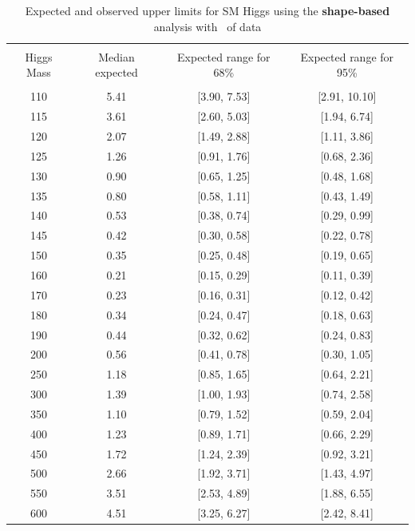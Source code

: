 \begin{table}[hbp!]
\begin{center}
\begin{tabular}{c c c c}
\hline
\vspace{-3mm} && \\
 Higgs Mass   & Median expected & Expected range for 68\% & Expected range for 95\%   \\
\vspace{-3mm} && \\
\hline
110 &  5.41 & [3.90, 7.53] & [2.91, 10.10] \\
115 &  3.61 & [2.60, 5.03] & [1.94, 6.74] \\
120 &  2.07 & [1.49, 2.88] & [1.11, 3.86] \\
125 &  1.26 & [0.91, 1.76] & [0.68, 2.36] \\
130 &  0.90 & [0.65, 1.25] & [0.48, 1.68] \\
135 &  0.80 & [0.58, 1.11] & [0.43, 1.49] \\
140 &  0.53 & [0.38, 0.74] & [0.29, 0.99] \\
145 &  0.42 & [0.30, 0.58] & [0.22, 0.78] \\
150 &  0.35 & [0.25, 0.48] & [0.19, 0.65] \\
160 &  0.21 & [0.15, 0.29] & [0.11, 0.39] \\
170 &  0.23 & [0.16, 0.31] & [0.12, 0.42] \\
180 &  0.34 & [0.24, 0.47] & [0.18, 0.63] \\
190 &  0.44 & [0.32, 0.62] & [0.24, 0.83] \\
200 &  0.56 & [0.41, 0.78] & [0.30, 1.05] \\
250 &  1.18 & [0.85, 1.65] & [0.64, 2.21] \\
300 &  1.39 & [1.00, 1.93] & [0.74, 2.58] \\
350 &  1.10 & [0.79, 1.52] & [0.59, 2.04] \\
400 &  1.23 & [0.89, 1.71] & [0.66, 2.29] \\
450 &  1.72 & [1.24, 2.39] & [0.92, 3.21] \\
500 &  2.66 & [1.92, 3.71] & [1.43, 4.97] \\
550 &  3.51 & [2.53, 4.89] & [1.88, 6.55] \\
600 &  4.51 & [3.25, 6.27] & [2.42, 8.41] \\
\hline
\end{tabular}
\caption{Expected and observed upper limits for SM Higgs using the
  {\bf shape-based} analysis with \intlumiEightTeV\ of data}
\label{tab:mvabase_uls}
\end{center}
\end{table}

